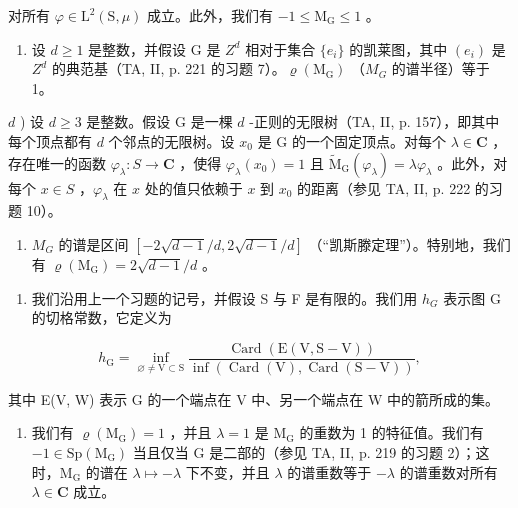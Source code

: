 对所有 \(\varphi\in\mathrm{L}^{2}(\mathrm{S},\mu)\) 成立。此外，我们有 \(-1\leqslant\mathrm{M}_{\mathrm{G}}\leqslant1\) 。

\begin{enumerate}
\def\labelenumi{\alph{enumi})}
\setcounter{enumi}{2}
\tightlist
\item
  设 \(d \geqslant 1\) 是整数，并假设 G 是 \(Z^{d}\) 相对于集合 \(\{e_{i}\}\) 的凯莱图，其中 \((e_{i})\) 是 \(Z^{d}\) 的典范基（TA, II, p. 221 的习题 7）。\(\varrho(\mathrm{M}_{\mathrm{G}})\) （\(M_{G}\) 的谱半径）等于 1。
\end{enumerate}

\(d\) ) 设 \(d \geqslant 3\) 是整数。假设 G 是一棵 \(d\) -正则的无限树（TA, II, p. 157），即其中每个顶点都有 \(d\) 个邻点的无限树。设 \(x_0\) 是 G 的一个固定顶点。对每个 \(\lambda \in \mathbf{C}\) ，存在唯一的函数 \(\varphi_{\lambda} \colon S \to \mathbf{C}\) ，使得 \(\varphi_{\lambda}(x_0) = 1\) 且 \(\widetilde{\mathrm{M}}_{\mathrm{G}}(\varphi_{\lambda}) = \lambda \varphi_{\lambda}\) 。此外，对每个 \(x \in S\) ，\(\varphi_{\lambda}\) 在 \(x\) 处的值只依赖于 \(x\) 到 \(x_0\) 的距离（参见 TA, II, p. 222 的习题 10）。

\begin{enumerate}
\def\labelenumi{\alph{enumi})}
\setcounter{enumi}{4}
\tightlist
\item
  \(M_{G}\) 的谱是区间 \([-2\sqrt{d-1}/d, 2\sqrt{d-1}/d]\) （“凯斯滕定理”）。特别地，我们有 \(\varrho(\mathrm{M}_{\mathrm{G}})=2\sqrt{d-1}/d\) 。
\end{enumerate}

\begin{enumerate}
\def\labelenumi{\arabic{enumi})}
\setcounter{enumi}{15}
\tightlist
\item
  我们沿用上一个习题的记号，并假设 S 与 F 是有限的。我们用 \(h_{G}\) 表示图 G 的切格常数，它定义为
\end{enumerate}

\[
h _ {\mathrm{G}} = \inf _ {\varnothing \neq \mathrm{V} \subset \mathrm{S}} \frac {\operatorname{Card} (\mathrm{E} (\mathrm{V} , \mathrm{S} - \mathrm{V}))}{\inf (\operatorname{Card} (\mathrm{V}) , \operatorname{Card} (\mathrm{S} - \mathrm{V}))},
\]

其中 E(V, W) 表示 G 的一个端点在 V 中、另一个端点在 W 中的箭所成的集。

\begin{enumerate}
\def\labelenumi{\alph{enumi})}
\tightlist
\item
  我们有 \(\varrho(\mathrm{M}_{\mathrm{G}})=1\) ，并且 \(\lambda=1\) 是 \(\mathrm{M}_{\mathrm{G}}\) 的重数为 1 的特征值。我们有 \(-1\in\mathrm{Sp}(\mathrm{M}_{\mathrm{G}})\) 当且仅当 G 是二部的（参见 TA, II, p. 219 的习题 2）；这时，\(\mathrm{M}_{\mathrm{G}}\) 的谱在 \(\lambda\mapsto-\lambda\) 下不变，并且 \(\lambda\) 的谱重数等于 \(-\lambda\) 的谱重数对所有 \(\lambda\in\mathbf{C}\) 成立。
\end{enumerate}

